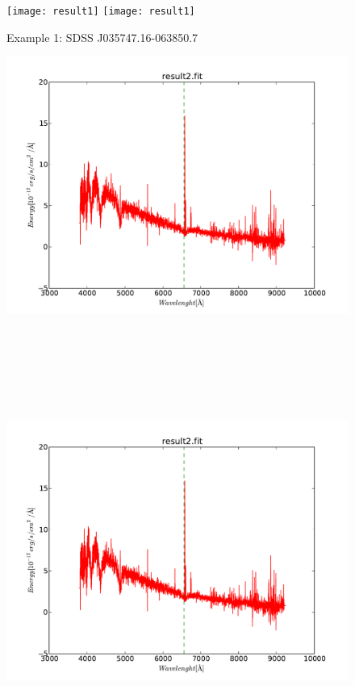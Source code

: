 


   \begin{figure}[!htbp]
      \begin{center}
        \leavevmode
        \ifpdf
        \texttt{[image: result1]}
        \else
        \texttt{[image: result1]}
        \fi
        \caption{Example 1: SDSS J035747.16-063850.7 }
        
        \label{FigResult1}
      \end{center}
    \end{figure}

   \begin{figure}[!htbp]
      \begin{center}
        \leavevmode
        \ifpdf
        \includegraphics[scale =.6]{result2}
        \else
        \includegraphics[bb = 92 86 545 742, height=6in]{result2}

\end{center}
\end{figure}
